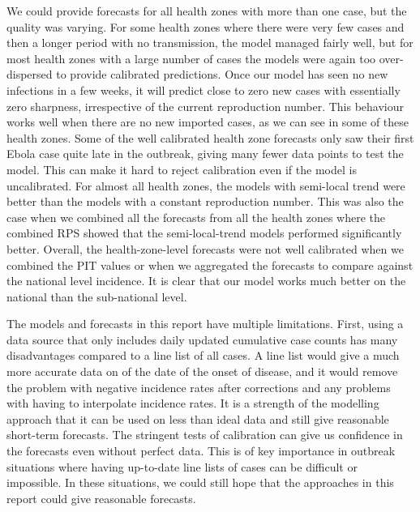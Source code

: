 \documentclass[12pt]{article}
\begin{document}
We could provide forecasts for all health zones with more than one case, but the quality was varying. For some health zones where there were very few cases and then a longer period with no transmission, the model managed fairly well, but for most health zones with a large number of cases the models were again too over-dispersed to provide calibrated predictions. Once our model has seen no new infections in a few weeks, it will predict close to zero new cases with essentially zero sharpness, irrespective of the current reproduction number. This behaviour works well when there are no new imported cases, as we can see in some of these health zones. Some of the well calibrated health zone forecasts only saw their first Ebola case quite late in the outbreak, giving many fewer data points to test the model. This can make it hard to reject calibration even if the model is uncalibrated. For almost all health zones, the models with semi-local trend were better than the models with a constant reproduction number. This was also the case when we combined all the forecasts from all the health zones where the combined RPS showed that the semi-local-trend models performed significantly better. Overall, the health-zone-level forecasts were not well calibrated when we combined the PIT values or when we aggregated the forecasts to compare against the national level incidence. It is clear that our model works much better on the national than the sub-national level.  



The models and forecasts in this report have multiple limitations. First, using a data source that only includes daily updated cumulative case counts has many disadvantages compared to a line list of all cases. A line list would give a much more accurate data on of the date of the onset of disease, and it would remove the problem with negative incidence rates after corrections and any problems with having to interpolate incidence rates. It is a strength of the modelling approach that it can be used on less than ideal data and still give reasonable short-term forecasts. The stringent tests of calibration can give us confidence in the forecasts even without perfect data. This is of key importance in outbreak situations where having up-to-date line lists of cases can be difficult or impossible. In these situations, we could still hope that the approaches in this report could give reasonable forecasts. 
\end{document}
